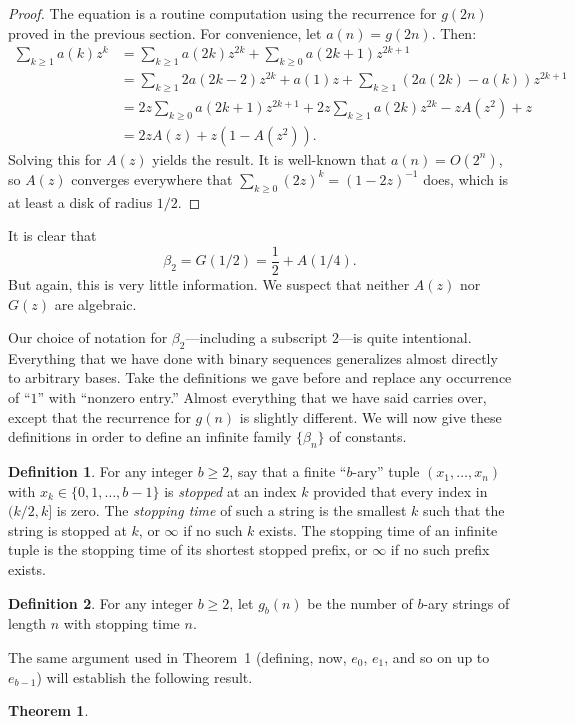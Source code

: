 \documentclass[12pt]{amsart}
\newtheorem{theorem}{Theorem}
\theoremstyle{definition}
\newtheorem{definition}{Definition}
\begin{document}
\begin{proof}
    The equation is a routine computation using the recurrence for $g(2n)$ proved in
    the previous section. For convenience, let $a(n) = g(2n)$. Then:
    \begin{align*}
        \sum_{k \geq 1} a(k) z^k
            &= \sum_{k \geq 1} a(2k) z^{2k} + \sum_{k \geq 0} a(2k + 1) z^{2k + 1} \\
            &= \sum_{k \geq 1} 2 a(2k - 2) z^{2k} + a(1) z + \sum_{k \geq 1} (2a(2k) - a(k)) z^{2k + 1} \\
            &= 2 z \sum_{k \geq 0} a(2k + 1) z^{2k + 1} + 2 z \sum_{k \geq 1} a(2k) z^{2k} - z A(z^2) + z \\
            &= 2z A(z) + z(1 - A(z^2)).
    \end{align*}
    Solving this for $A(z)$ yields the result. It is well-known that $a(n) =
    O(2^n)$, so $A(z)$ converges everywhere that $\sum_{k \geq 0} (2z)^k = (1 -
    2z)^{-1}$ does, which is at least a disk of radius $1/2$.
\end{proof}

It is clear that
\begin{equation*}
    \beta_2 = G(1/2) =\frac{1}{2} + A(1/4).
\end{equation*}
But again, this is very little information. We suspect that neither $A(z)$ nor
$G(z)$ are algebraic.

Our choice of notation for $\beta_2$---including a subscript $2$---is quite
intentional. Everything that we have done with binary sequences generalizes
almost directly to arbitrary bases. Take the definitions we gave before and
replace any occurrence of ``$1$'' with ``nonzero entry.'' Almost everything
that we have said carries over, except that the recurrence for $g(n)$ is
slightly different. We will now give these definitions in order to define an
infinite family $\{\beta_n\}$ of constants.

\begin{definition}
    For any integer $b \geq 2$, say that a finite ``$b$-ary'' tuple $(x_1,
    \dots, x_n)$ with $x_k \in \{0, 1, \dots, b - 1\}$ is \emph{stopped} at an
    index $k$ provided that every index in $(k / 2, k]$ is zero. The
    \emph{stopping time} of such a string is the smallest $k$ such that the
    string is stopped at $k$, or $\infty$ if no such $k$ exists. The stopping
    time of an infinite tuple is the stopping time of its shortest stopped
    prefix, or $\infty$ if no such prefix exists.
\end{definition}

\begin{definition}
    For any integer $b \geq 2$, let $g_b(n)$ be the number of $b$-ary strings
    of length $n$ with stopping time $n$.
\end{definition}

The same argument used in Theorem~1 (defining, now, $e_0$, $e_1$, and so on up
to $e_{b - 1}$) will establish the following result.

\begin{theorem}
\end{theorem}
\end{document}
